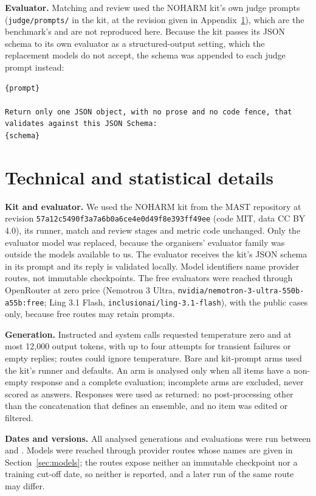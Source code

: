 \documentclass[11pt]{article}
\begin{document}
\textbf{Evaluator.} Matching and review used the NOHARM kit's own judge prompts
(\nolinkurl{judge/prompts/} in the kit, at the revision given in Appendix~\ref{app:technical}),
which are the benchmark's and are not reproduced here. Because the kit passes its JSON schema to
its own evaluator as a structured-output setting, which the replacement models do not accept, the
schema was appended to each judge prompt instead:
\begin{lstlisting}
{prompt}

Return only one JSON object, with no prose and no code fence, that validates against this JSON Schema:
{schema}
\end{lstlisting}

\section{Technical and statistical details}
\label{app:technical}
\textbf{Kit and evaluator.} We used the NOHARM kit from the MAST repository at revision
\texttt{57a12c5490f3a7a6b0a6ce4e0d49f8e393ff49ee} (code MIT, data CC BY 4.0), its runner, match and
review stages and metric code unchanged. Only the evaluator model was replaced, because the
organisers' evaluator family was outside the models available to us. The evaluator receives the
kit's JSON schema in its prompt and its reply is validated locally. Model identifiers name provider
routes, not immutable checkpoints. The free evaluators were reached through OpenRouter at zero
price (Nemotron 3 Ultra, \texttt{nvidia/nemotron-3-ultra-550b-a55b:free}; Ling 3.1 Flash,
\texttt{inclusionai/ling-3.1-flash}), with the public cases only, because free routes may retain
prompts.

\textbf{Generation.} Instructed and system calls requested temperature zero and at most 12,000
output tokens, with up to four attempts for transient failures or empty replies; routes could
ignore temperature. Bare and kit-prompt arms used the kit's runner and defaults. An arm is analysed
only when all \nItems{} items have a non-empty response and a complete evaluation; incomplete arms
are excluded, never scored as answers. Responses were used as returned: no post-processing other than
the concatenation that defines an ensemble, and no item was edited or filtered.

\textbf{Dates and versions.} All analysed generations and evaluations were run between
\covFirstJudged{} and \covLastJudged{}. Models were reached through provider routes whose names
are given in Section~\ref{sec:models}; the routes expose neither an immutable checkpoint nor a
training cut-off date, so neither is reported, and a later run of the same route may differ.
\end{document}
